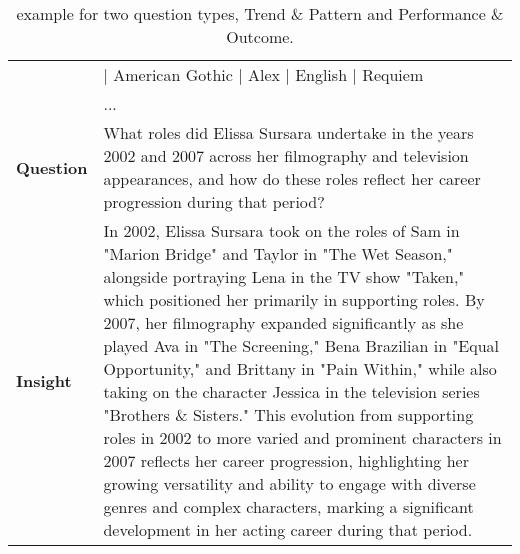 \begin{table*}[htbp]
\begin{small}
\begin{tabularx}{\textwidth}{%
>{\arraybackslash}p{}
>{\arraybackslash}X
}
& [ROW 3] 1996 | American Gothic | Alex | English | Requiem \\
& ... \\ \midrule
\textbf{Question}
& What roles did Elissa Sursara undertake in the years 2002 and 2007 across her filmography and television appearances, and how do these roles reflect her career progression during that period? \\ \midrule
\textbf{Insight}
& In 2002, Elissa Sursara took on the roles of Sam in "Marion Bridge" and Taylor in "The Wet Season," alongside portraying Lena in the TV show "Taken," which positioned her primarily in supporting roles. By 2007, her filmography expanded significantly as she played Ava in "The Screening," Bena Brazilian in "Equal Opportunity," and Brittany in "Pain Within," while also taking on the character Jessica in the television series "Brothers \& Sisters." This evolution from supporting roles in 2002 to more varied and prominent characters in 2007 reflects her career progression, highlighting her growing versatility and ability to engage with diverse genres and complex characters, marking a significant development in her acting career during that period. \\
\bottomrule
\end{tabularx}
\end{small}
\caption{\bench example for two question types, Trend \& Pattern and Performance \& Outcome.}
\label{case:bench_ii}
\end{table*}